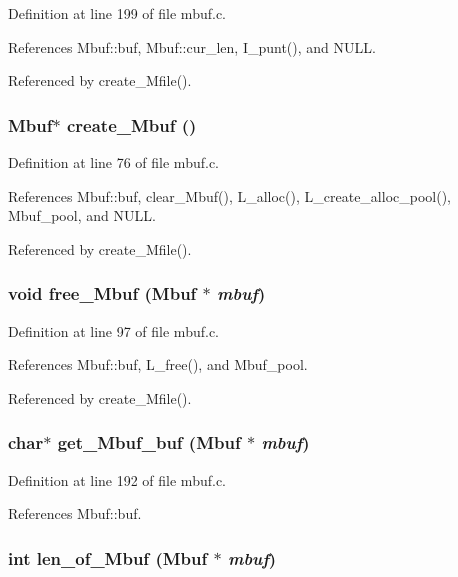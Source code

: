 Definition at line 199 of file mbuf.c.

References Mbuf::buf, Mbuf::cur\_\-len, I\_\-punt(), and NULL.

Referenced by create\_\-Mfile().
\subsubsection{\setlength{\rightskip}{0pt plus 5cm}\bf{Mbuf}$\ast$ create\_\-Mbuf ()}\label{mbuf_8c_b8cda8111fbc6f311789287d0da940c0}




Definition at line 76 of file mbuf.c.

References Mbuf::buf, clear\_\-Mbuf(), L\_\-alloc(), L\_\-create\_\-alloc\_\-pool(), Mbuf\_\-pool, and NULL.

Referenced by create\_\-Mfile().
\subsubsection{\setlength{\rightskip}{0pt plus 5cm}void free\_\-Mbuf (\bf{Mbuf} $\ast$ {\em mbuf})}\label{mbuf_8c_ddc737730a33ac71ecf20eea569109da}




Definition at line 97 of file mbuf.c.

References Mbuf::buf, L\_\-free(), and Mbuf\_\-pool.

Referenced by create\_\-Mfile().
\subsubsection{\setlength{\rightskip}{0pt plus 5cm}char$\ast$ get\_\-Mbuf\_\-buf (\bf{Mbuf} $\ast$ {\em mbuf})}\label{mbuf_8c_1c89d1ad9dc057da36fcd31172947268}




Definition at line 192 of file mbuf.c.

References Mbuf::buf.
\subsubsection{\setlength{\rightskip}{0pt plus 5cm}int len\_\-of\_\-Mbuf (\bf{Mbuf} $\ast$ {\em mbuf})}\label{mbuf_8c_ce4134f51839529d98f13bb2781c0685}




